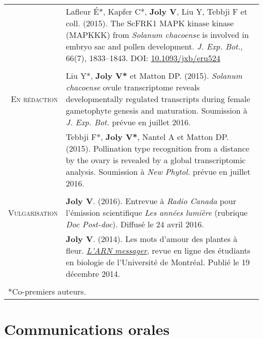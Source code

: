 \documentclass[letterpaper,10pt]{article}
\begin{document}
{\begin{tabular}{r|p{12.5cm}}
& Lafleur É*, Kapfer C*, \textbf{Joly V}, Liu Y, Tebbji F et coll. (2015). The ScFRK1 MAPK kinase kinase (MAPKKK) from \emph{Solanum chacoense} is involved in embryo sac and pollen development. \emph{J. Exp. Bot.}, 66(7), 1833--1843. DOI: \href{http://doi.org/10.1093/jxb/eru524}{10.1093/jxb/eru524} \\

\multicolumn{2}{c}{} \\

\textsc{En rédaction}

& Liu Y*, \textbf{Joly V*} et Matton DP. (2015). \emph{Solanum chacoense} ovule transcriptome reveals developmentally regulated transcripts during female gametophyte genesis and maturation. Soumission à \emph{J. Exp. Bot.} prévue en juillet 2016. \vspace{3mm} \\

& Tebbji F*, \textbf{Joly V*}, Nantel A et Matton DP. (2015). Pollination type recognition from a distance by the ovary is revealed by a global transcriptomic analysis. Soumission à \emph{New Phytol.} prévue en juillet 2016. \\

\multicolumn{2}{c}{} \\

\textsc{Vulgarisation}

& \textbf{Joly V}. (2016). Entrevue à \emph{Radio Canada}  pour l'émission scientifique \emph{Les années lumière} (rubrique \emph{Doc Post-doc}). Diffusé le 24 avril 2016. \vspace{3mm} \\

& \textbf{Joly V}. (2014). Les mots d'amour des plantes à fleur. \href{http://arnmessager.com/2014/12/19/les-mots-damour-des-plantes-a-fleurs/}{\emph{L'ARN messager}}, revue en ligne des étudiants en biologie de l'Université de Montréal. Publié le 19 décembre 2014.\\

\multicolumn{2}{l}{\vspace{1mm}} \\
\multicolumn{2}{l}{*Co-premiers auteurs.} \\

\end{tabular}


\section{Communications orales}
\begin{tabular}{r|p{14.1cm}}


\end{tabular}}
\end{document}
